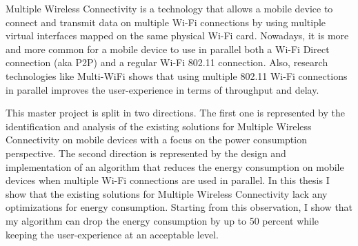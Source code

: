 
Multiple Wireless Connectivity is a technology that allows a mobile device to
connect and transmit data on multiple Wi-Fi connections by using multiple virtual
interfaces mapped on the same physical Wi-Fi card. Nowadays, it is more and
more common for a mobile device to use in parallel both a Wi-Fi Direct
connection (aka P2P) and a regular Wi-Fi 802.11 connection. Also, research
technologies like Multi-WiFi shows that using multiple 802.11 Wi-Fi connections
in parallel improves the user-experience in terms of throughput and delay.

This master project is split in two directions. The first one is represented by the identification
and analysis of the existing solutions for Multiple Wireless Connectivity on mobile
devices with a focus on the power consumption perspective. The second direction
is represented by the design and implementation of an algorithm that reduces the energy consumption
on mobile devices when multiple Wi-Fi connections are used in parallel. In this
thesis I show that the existing solutions for Multiple Wireless Connectivity
lack any optimizations for energy consumption. Starting from this observation,
I show that my algorithm can drop the energy consumption by up to 50 percent
while keeping the user-experience at an acceptable level.





 

